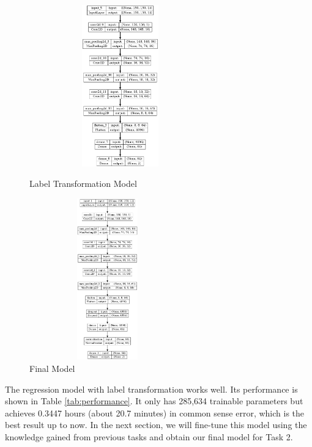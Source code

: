 \documentclass{article}
\begin{document}
\begin{figure}[!h]
	\centering
	\begin{minipage}[t]{0.4\textwidth}%
		\centering
		\includegraphics[width=0.7\textwidth, height=7cm]{./fig/label_model.png}
		\caption{Label Transformation Model}
		\label{fig:labeltrans}
	\end{minipage}
    \hspace{0.8cm}
	\begin{minipage}[t]{0.4\textwidth}%
		\centering
		\includegraphics[width=0.6\textwidth, height=7cm]{./fig/final_model.png}
		\caption{Final Model}
		\label{fig:final}
	\end{minipage}
\end{figure}

The regression model with label transformation works well. Its performance is shown in Table \ref{tab:performance}. It only has 285,634 trainable parameters but achieves 0.3447 hours (about 20.7 minutes) in common sense error, which is the best result up to now. In the next section, we will fine-tune this model using the knowledge gained from previous tasks and obtain our final model for Task 2.
\end{document}
